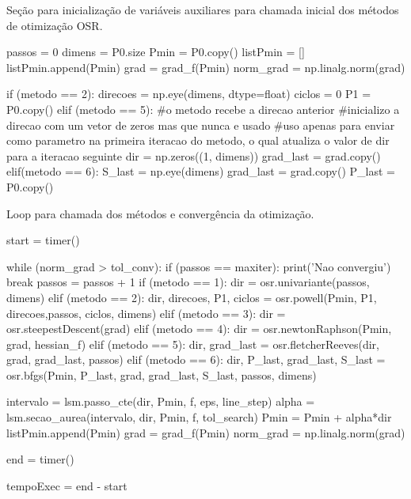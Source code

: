 \documentclass[10pt, a4paper]{article}
\begin{document}



Seção para inicialização de variáveis auxiliares para chamada inicial dos métodos de otimização OSR.

\begin{python}
  passos = 0
  dimens = P0.size
  Pmin = P0.copy()
  listPmin = []
  listPmin.append(Pmin)
  grad = grad_f(Pmin)
  norm_grad = np.linalg.norm(grad)

  if (metodo == 2):
      direcoes = np.eye(dimens, dtype=float)
      ciclos = 0
      P1 = P0.copy()
  elif (metodo == 5):
      #o metodo recebe a direcao anterior 
      #inicializo a direcao com um vetor de zeros mas que nunca e usado
      #uso apenas para enviar como parametro na primeira iteracao do metodo, o qual atualiza o valor de dir para a iteracao seguinte
      dir = np.zeros((1, dimens))
      grad_last = grad.copy()
  elif(metodo == 6):
      S_last = np.eye(dimens)
      grad_last = grad.copy()
      P_last = P0.copy()
\end{python}

Loop para chamada dos métodos e convergência da otimização.

\begin{python}
  start = timer()

  while (norm_grad > tol_conv):
      if (passos == maxiter):
          print('Nao convergiu')
          break
      passos = passos + 1
      if (metodo == 1):
          dir = osr.univariante(passos, dimens)
      elif (metodo == 2):
          dir, direcoes, P1, ciclos = osr.powell(Pmin, P1, direcoes,passos, ciclos, dimens)
      elif (metodo == 3):
          dir = osr.steepestDescent(grad)
      elif (metodo == 4):
          dir = osr.newtonRaphson(Pmin, grad, hessian_f)
      elif (metodo == 5):
          dir, grad_last = osr.fletcherReeves(dir, grad, grad_last, passos)
      elif (metodo == 6):
          dir, P_last, grad_last, S_last = osr.bfgs(Pmin, P_last, grad, grad_last, S_last, passos, dimens)
      
      intervalo = lsm.passo_cte(dir, Pmin, f, eps, line_step)
      alpha = lsm.secao_aurea(intervalo, dir, Pmin, f, tol_search)
      Pmin = Pmin + alpha*dir
      listPmin.append(Pmin)
      grad = grad_f(Pmin)
      norm_grad = np.linalg.norm(grad)    

  end = timer()

  tempoExec = end - start
\end{python}
\end{document}
